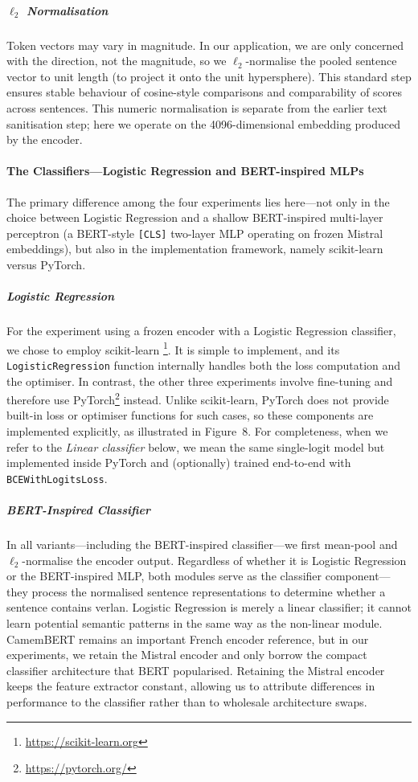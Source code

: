\documentclass[12pt]{article}
\begin{document}
%
\subparagraph{\(\ell_{2}\) Normalisation}
Token vectors may vary in magnitude. In our application, we are only concerned with the direction, not the magnitude, so we \(\ell_{2}\)-normalise the pooled sentence vector to unit length (to project it onto the unit hypersphere). This standard step ensures stable behaviour of cosine-style comparisons and comparability of scores across sentences. This numeric normalisation is separate from the earlier text sanitisation step; here we operate on the 4096-dimensional embedding produced by the encoder.

\paragraph{The Classifiers\;---\;Logistic Regression and BERT-inspired MLPs}
The primary difference among the four experiments lies here\;---\;not only in the choice between Logistic Regression and a shallow BERT-inspired multi-layer perceptron (a BERT-style \texttt{[CLS]} two-layer MLP operating on frozen Mistral embeddings), but also in the implementation framework, namely scikit-learn versus PyTorch.

\subparagraph{Logistic Regression}
For the experiment using a frozen encoder with a Logistic Regression classifier, we chose to employ scikit-learn \footnote{\url{https://scikit-learn.org}}. 
It is simple to implement, and its \texttt{LogisticRegression} function internally handles both the loss computation and the optimiser. 
In contrast, the other three experiments involve fine-tuning and therefore use PyTorch\footnote{\url{https://pytorch.org/}} instead. 
Unlike scikit-learn, PyTorch does not provide built-in loss or optimiser functions for such cases, so these components are implemented explicitly, as illustrated in Figure~8. 
For completeness, when we refer to the \textit{Linear classifier} below, we mean the same single-logit model but implemented inside PyTorch and (optionally) trained end-to-end with \texttt{BCEWithLogitsLoss}.

\subparagraph{BERT-Inspired Classifier}
In all variants\;---\;including the BERT-inspired classifier\;---\;we first mean-pool and $\ell_2$-normalise the encoder output.
Regardless of whether it is Logistic Regression or the BERT-inspired MLP, both modules serve as the classifier component\;---\;they process the normalised sentence representations to determine whether a sentence contains verlan.
Logistic Regression is merely a linear classifier; it cannot learn potential semantic patterns in the same way as the non-linear module. 
CamemBERT remains an important French encoder reference, but in our experiments, we retain the Mistral encoder and only borrow the compact classifier architecture that BERT popularised. Retaining the Mistral encoder keeps the feature extractor constant, allowing us to attribute differences in performance to the classifier rather than to wholesale architecture swaps.
\end{document}
